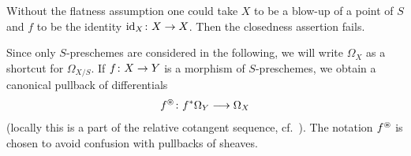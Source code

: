 \documentclass[a4paper,parskip=half,numbers=enddot, DIV=12]{scrreprt}
\begin{document}
\begin{rem*}
	Without the flatness assumption one could take $X$ to be a blow-up of  a point of $S$ and $f$ to be the identity $\id_X\colon X\morphism X$. Then the closedness assertion fails.
\end{rem*}
Since only $S$-preschemes are considered in the following, we will write $\Omega_X$ as a shortcut for $\Omega_{X/S}$. If $f\colon X\morphism Y$ is a morphism of $S$-preschemes, we obtain a canonical pullback of differentials
\begin{align*}
	f^\oast \colon f^*\Omega_Y\morphism\Omega_X
\end{align*}
(locally this is a part of the relative cotangent sequence, cf.\ \cite[Corollary~1.4.2]{alg2}). The notation $f^\oast$ is chosen to avoid confusion with pullbacks of sheaves.
\end{document}
